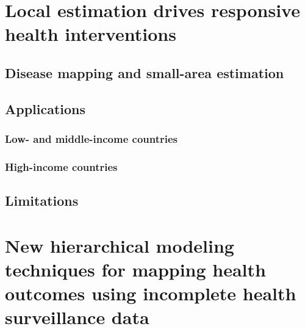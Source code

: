 \documentclass[
]{article}
\begin{document}
\lipsum[11-15]

\hypertarget{local-estimation-drives-responsive-health-interventions}{%
\section{Local estimation drives responsive health interventions}\label{local-estimation-drives-responsive-health-interventions}}

\lipsum[1-3]

\hypertarget{disease-mapping-and-small-area-estimation}{%
\subsection{Disease mapping and small-area estimation}\label{disease-mapping-and-small-area-estimation}}

\lipsum[4-8]

\hypertarget{applications}{%
\subsection{Applications}\label{applications}}

\lipsum[9-10]

\hypertarget{low--and-middle-income-countries}{%
\subsubsection{Low- and middle-income countries}\label{low--and-middle-income-countries}}

\lipsum[11-13]

\hypertarget{high-income-countries}{%
\subsubsection{High-income countries}\label{high-income-countries}}

\lipsum[13-15]

\hypertarget{limitations}{%
\subsection{Limitations}\label{limitations}}

\lipsum[1-4]

\hypertarget{new-hierarchical-modeling-techniques-for-mapping-health-outcomes-using-incomplete-health-surveillance-data}{%
\section{New hierarchical modeling techniques for mapping health outcomes using incomplete health surveillance data}\label{new-hierarchical-modeling-techniques-for-mapping-health-outcomes-using-incomplete-health-surveillance-data}}
\end{document}
